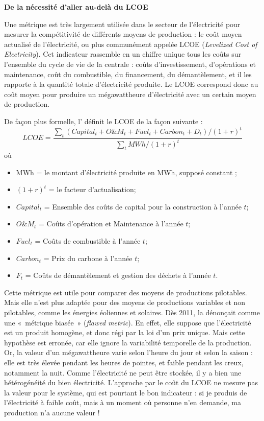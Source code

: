 \textbf{De la nécessité d’aller au-delà du LCOE}

Une métrique est très largement utilisée dans le secteur de l’électricité pour mesurer la compétitivité de différents moyens de production : le coût moyen actualisé de l’électricité, ou plus communément appelée LCOE (\textit{Levelized Cost of Electricity}).
Cet indicateur rassemble en un chiffre unique tous les coûts sur l’ensemble du cycle de vie de la centrale : coûts d’investissement, d’opérations et maintenance, coût du combustible, du financement, du démantèlement, et il les rapporte à la quantité totale d’électricité produite. Le LCOE correspond donc au coût moyen pour produire un mégawattheure d’électricité avec un certain moyen de production.

De façon plus formelle, l'\citet{InternationalEnergyAgency2015} définit le LCOE de la façon suivante :
$$LCOE = \frac{\sum_t (Capital_t + O\&M_t + Fuel_t + Carbon_t + D_t) / (1+r)^t}{\sum_t MWh / (1+r)^t}$$
où
\begin{itemize}
	\item MWh = le montant d'électricité produite en MWh, supposé constant ;
	\item $(1+r)^t$ = le facteur d'actualisation;
	\item $Capital_t$ = Ensemble des coûts de capital pour la construction à l'année $t$;
	\item $O\&M_t$ = Coûts d'opération et Maintenance à l'année $t$;
	\item $Fuel_t$ = Coûts de combustible à l'année $t$;
	\item $Carbon_t$ = Prix du carbone à l'année $t$;
	\item $F_t$ = Coûts de démantèlement et gestion des déchets à l'année $t$.
\end{itemize}

Cette métrique est utile pour comparer des moyens de productions pilotables. Mais elle n’est plus adaptée pour des moyens de productions variables et non pilotables, comme les énergies éoliennes et solaires. Dès 2011, \citet{Joskow2011a} la dénonçait comme une «~métrique biasée~» (\textit{flawed metric}). En effet, elle suppose que l’électricité est un produit homogène, et donc régi par la loi d’un prix unique. Mais cette hypothèse est erronée, car elle ignore la variabilité temporelle de la production. Or, la valeur d’un mégawattheure varie selon l’heure du jour et selon la saison : elle est très élevée pendant les heures de pointes, et faible pendant les creux, notamment la nuit. Comme l’électricité ne peut être stockée, il y a bien une hétérogénéité du bien électricité. L’approche par le coût du LCOE ne mesure pas la valeur pour le système, qui est pourtant le bon indicateur : si je produis de l’électricité à faible coût, mais à un moment où personne n’en demande, ma production n’a aucune valeur !

